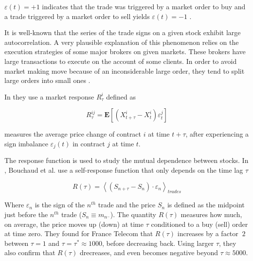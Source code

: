 $\varepsilon(t) = +1$ indicates that the trade was triggered by a market order
to buy and a trade triggered by a market order to sell yields
$\varepsilon(t) = -1$
\cite{subtle_nature,Bouchaud_2004,spread_changes_affect,quant_stock_price_response,order_flow_persistent}.

It is well-known that the series of the trade signs on a given stock exhibit
large autocorrelation. A very plausible explanation of this phenomenon relies
on the execution strategies of some major brokers on given markets. These
brokers have large transactions to execute on the account of some clients. In
order to avoid market making move because of an inconsiderable large order,
they tend to split large orders into small ones \cite{empirical_facts}.

In \cite{dissecting_cross} they use a market response $R_{\tau}^{i}$ defined as

\begin{equation}\label{eq:dissecting_cross}
    R_{\tau}^{ij} = \mathbf{E} \left[ \left( X_{t+\tau}^{i} - X_{t}^{i}
    \right) \varepsilon_{t}^{j} \right]
\end{equation}

measures the
average price change of contract $i$ at time $t+\tau$, after experiencing a
sign imbalance $\varepsilon_{j}\left(t\right)$ in contract $j$ at time $t$.


The response function is used to study the mutual dependence between stocks. In
\cite{r_walks_liquidity,subtle_nature,Bouchaud_2004}, Bouchaud et al. use a self-response
function that only depends on the time lag $\tau$

\begin{equation}\label{eq:Bouchaud_2004}
    R\left(\tau\right)=\left\langle \left(S_{n+\tau}-S_{n}\right) \cdot
    \varepsilon_{n}\right\rangle_{trades}
\end{equation}

Where $\varepsilon_{n}$ is the sign of the $n^{th}$ trade and the price $S_n$
is defined as the midpoint just before the $n^{th}$ trade
($S_{n} \equiv m_{n^{-}}$).
The quantity $R\left(\tau\right)$ measures how much, on average, the price
moves up (down) at time $\tau$ conditioned to a buy (sell) order at time zero.
They found for France Telecom that $R\left(\tau \right)$ increases by a factor $~2$ between $\tau = 1$
and $\tau = \tau^{*} \approx 1000$, before decreasing back. Using larger $\tau$,
they also confirm that $R\left(\tau\right)$ drecreases, and even becomes negative
beyond $\tau \approx 5000$.

